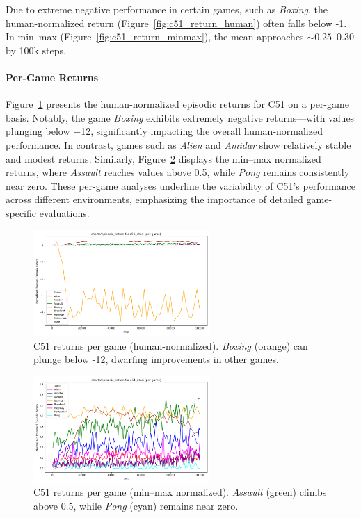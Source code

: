 Due to extreme negative performance in certain games, such as \emph{Boxing}, 
the human-normalized return (Figure~\vref{fig:c51_return_human}) 
often falls below -1. In min--max (Figure~\vref{fig:c51_return_minmax}), 
the mean approaches $\sim0.25$--$0.30$ by 100k steps.

\paragraph{Per-Game Returns}
Figure~\ref{fig:c51_return_pergame_human} presents the human-normalized episodic returns for C51 on a per-game basis. Notably, the game \emph{Boxing} exhibits extremely negative returns—with values plunging below \num{-12}, significantly impacting the overall human-normalized performance. In contrast, games such as \emph{Alien} and \emph{Amidar} show relatively stable and modest returns. Similarly, Figure~\ref{fig:c51_return_pergame_minmax} displays the min--max normalized returns, where \emph{Assault} reaches values above \num{0.5}, while \emph{Pong} remains consistently near zero. These per-game analyses underline the variability of C51's performance across different environments, emphasizing the importance of detailed game-specific evaluations.

\begin{figure}
	\centering
	\includegraphics[width=0.6\textwidth]{figures/c51/charts_episodic_return_per_game_human_c51_atari.png}
	\caption{C51 returns per game (human-normalized). 
		\emph{Boxing} (orange) can plunge below -12, dwarfing improvements in other games.}
	\label{fig:c51_return_pergame_human}
\end{figure}

\begin{figure}
	\centering
	\includegraphics[width=0.6\textwidth]{figures/c51/charts_episodic_return_per_game_minmax_c51_atari.png}
	\caption{C51 returns per game (min--max normalized). 
		\emph{Assault} (green) climbs above 0.5, while \emph{Pong} (cyan) remains near zero.}
	\label{fig:c51_return_pergame_minmax}
\end{figure}

